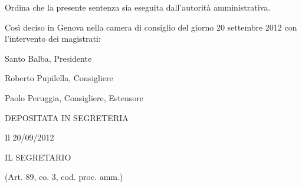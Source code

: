 Ordina che la presente sentenza sia eseguita dall'autorità amministrativa.

Così deciso in Genova nella camera di consiglio del giorno 20 settembre 2012 con
l'intervento dei magistrati:

Santo Balba, Presidente

Roberto Pupilella, Consigliere

Paolo Peruggia, Consigliere, Estensore

DEPOSITATA IN SEGRETERIA

Il 20/09/2012

IL SEGRETARIO

(Art. 89, co. 3, cod. proc. amm.)


